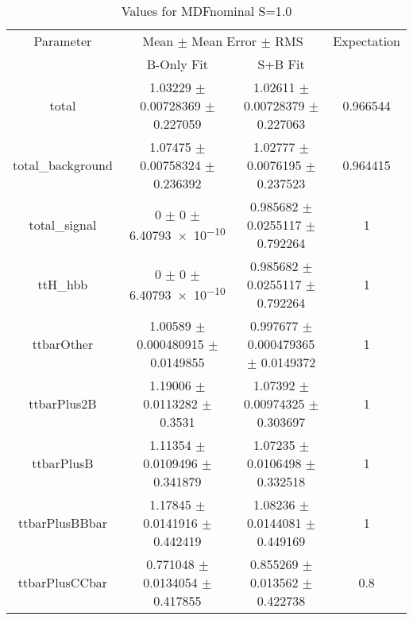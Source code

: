 \begin{table}
\centering
\caption{Values for MDFnominal S=1.0}
\begin{tabular}{cccc}
\toprule
Parameter & \multicolumn{2}{c}{Mean $\pm$ Mean Error $\pm$ RMS} & Expectation\\
 & B-Only Fit & S+B Fit & \\
\midrule
total & \num{1.03229} $\pm$ \num{0.00728369} $\pm$ \num{0.227059} & \num{1.02611} $\pm$ \num{0.00728379} $\pm$ \num{0.227063} & \num{0.966544}\\
total\_background & \num{1.07475} $\pm$ \num{0.00758324} $\pm$ \num{0.236392} & \num{1.02777} $\pm$ \num{0.0076195} $\pm$ \num{0.237523} & \num{0.964415}\\
total\_signal & \num{0} $\pm$ \num{0} $\pm$ \num{6.40793e-10} & \num{0.985682} $\pm$ \num{0.0255117} $\pm$ \num{0.792264} & \num{1}\\
ttH\_hbb & \num{0} $\pm$ \num{0} $\pm$ \num{6.40793e-10} & \num{0.985682} $\pm$ \num{0.0255117} $\pm$ \num{0.792264} & \num{1}\\
ttbarOther & \num{1.00589} $\pm$ \num{0.000480915} $\pm$ \num{0.0149855} & \num{0.997677} $\pm$ \num{0.000479365} $\pm$ \num{0.0149372} & \num{1}\\
ttbarPlus2B & \num{1.19006} $\pm$ \num{0.0113282} $\pm$ \num{0.3531} & \num{1.07392} $\pm$ \num{0.00974325} $\pm$ \num{0.303697} & \num{1}\\
ttbarPlusB & \num{1.11354} $\pm$ \num{0.0109496} $\pm$ \num{0.341879} & \num{1.07235} $\pm$ \num{0.0106498} $\pm$ \num{0.332518} & \num{1}\\
ttbarPlusBBbar & \num{1.17845} $\pm$ \num{0.0141916} $\pm$ \num{0.442419} & \num{1.08236} $\pm$ \num{0.0144081} $\pm$ \num{0.449169} & \num{1}\\
ttbarPlusCCbar & \num{0.771048} $\pm$ \num{0.0134054} $\pm$ \num{0.417855} & \num{0.855269} $\pm$ \num{0.013562} $\pm$ \num{0.422738} & \num{0.8}\\
\bottomrule
\end{tabular}
\end{table}